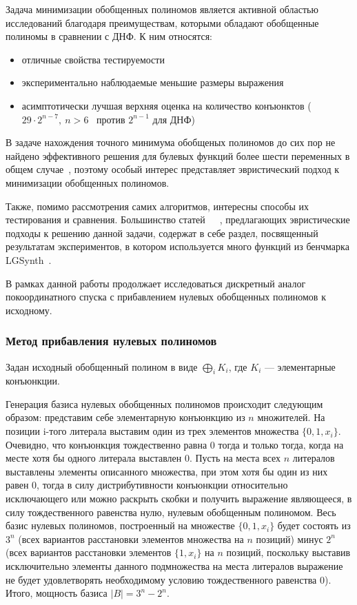 \documentclass[a4paper,12pt,titlepage,finall]{article}
\begin{document}
Задача минимизации обобщенных полиномов является активной областью исследований благодаря преимуществам, которыми обладают обобщенные полиномы в сравнении с ДНФ. К ним относятся:
\begin{itemize}
    \item отличные свойства тестируемости~\cite{exorcism4}
    \item экспериментально наблюдаемые меньшие размеры выражения
    \item асимптотически лучшая верхняя оценка на количество конъюнктов ($ 29 \cdot 2^{n - 7}, \ n > 6 $~\cite{bound} против $ 2^{n - 1} $ для ДНФ)
\end{itemize}

В задаче нахождения точного минимума обобщеных полиномов до сих пор не найдено эффективного решения для булевых функций более шести переменных в общем случае~\cite{exact}, поэтому особый интерес представляет эвристический подход к минимизации обобщенных полиномов.

Также, помимо рассмотрения самих алгоритмов, интересны способы их тестирования и сравнения. Большинство статей~\cite{exmin2}~\cite{mint}~\cite{exorcism4}, предлагающих эвристические подходы к решению данной задачи, содержат в себе раздел, посвященный результатам экспериментов, в котором используется много функций из бенчмарка LGSynth~\cite{benchmark}.

В рамках данной работы продолжает исследоваться дискретный аналог покоординатного спуска с прибавлением нулевых обобщенных полиномов к исходному.

\subsubsection*{Метод прибавления нулевых полиномов}

Задан исходный обобщенный полином в виде $ \bigoplus\limits_i K_i $, где $ K_i $ --- элементарные конъюнкции.

Генерация базиса нулевых обобщенных полиномов происходит следующим образом: представим себе элементарную конъюнкцию из $ n $ множителей. На позиции i-того литерала выставим один из трех элементов множества $ \{ 0, 1, x_i \} $. Очевидно, что конъюнкция тождественно равна 0 тогда и только тогда, когда на месте хотя бы одного литерала выставлен 0. Пусть на места всех $ n $ литералов выставлены элементы описанного множества, при этом хотя бы один из них равен 0, тогда в силу дистрибутивности конъюнкции относительно исключающего или можно раскрыть скобки и получить выражение являющееся, в силу тождественного равенства нулю, нулевым обобщенным полиномом. Весь базис нулевых полиномов, построенный на множестве $ \{ 0, 1, x_i \} $ будет состоять из $ 3^n $ (всех вариантов расстановки элементов множества на $ n $ позиций) минус $ 2^n $ (всех вариантов расстановки элементов $ \{ 1, x_i \} $ на $ n $ позиций, поскольку выставив исключительно элементы данного подмножества на места литералов выражение не будет удовлетворять необходимому условию тождественного равенства 0). Итого, мощность базиса $ \left| B \right| = 3^n - 2^n. $
\end{document}
